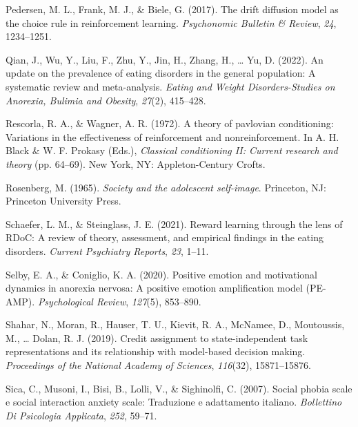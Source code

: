 \documentclass[
  man,floatsintext]{apa6}
\newlength{\cslhangindent}
\newlength{\cslentryspacingunit} %
\newenvironment{CSLReferences}[2] %
 {%
  \setlength{\parindent}{0pt}
  \ifodd #1
  \let\oldpar\par
  \def\par{\hangindent=\cslhangindent\oldpar}
  \fi
  \setlength{\parskip}{#2\cslentryspacingunit}
 }%
 {}
\begin{document}
\begin{CSLReferences}{1}{0}
\leavevmode{}%
Pedersen, M. L., Frank, M. J., \& Biele, G. (2017). The drift diffusion model as the choice rule in reinforcement learning. \emph{Psychonomic Bulletin \& Review}, \emph{24}, 1234--1251.

\leavevmode{}%
Qian, J., Wu, Y., Liu, F., Zhu, Y., Jin, H., Zhang, H., \ldots{} Yu, D. (2022). An update on the prevalence of eating disorders in the general population: A systematic review and meta-analysis. \emph{Eating and Weight Disorders-Studies on Anorexia, Bulimia and Obesity}, \emph{27}(2), 415--428.

\leavevmode{}%
Rescorla, R. A., \& Wagner, A. R. (1972). A theory of pavlovian conditioning: Variations in the effectiveness of reinforcement and nonreinforcement. In A. H. Black \& W. F. Prokasy (Eds.), \emph{Classical conditioning II: Current research and theory} (pp. 64--69). New York, NY: Appleton-Century Crofts.

\leavevmode{}%
Rosenberg, M. (1965). \emph{Society and the adolescent self-image}. Princeton, NJ: Princeton University Press.

\leavevmode{}%
Schaefer, L. M., \& Steinglass, J. E. (2021). Reward learning through the lens of RDoC: A review of theory, assessment, and empirical findings in the eating disorders. \emph{Current Psychiatry Reports}, \emph{23}, 1--11.

\leavevmode{}%
Selby, E. A., \& Coniglio, K. A. (2020). Positive emotion and motivational dynamics in anorexia nervosa: A positive emotion amplification model (PE-AMP). \emph{Psychological Review}, \emph{127}(5), 853--890.

\leavevmode{}%
Shahar, N., Moran, R., Hauser, T. U., Kievit, R. A., McNamee, D., Moutoussis, M., \ldots{} Dolan, R. J. (2019). Credit assignment to state-independent task representations and its relationship with model-based decision making. \emph{Proceedings of the National Academy of Sciences}, \emph{116}(32), 15871--15876.

\leavevmode{}%
Sica, C., Musoni, I., Bisi, B., Lolli, V., \& Sighinolfi, C. (2007). Social phobia scale e social interaction anxiety scale: Traduzione e adattamento italiano. \emph{Bollettino Di Psicologia Applicata}, \emph{252}, 59--71.


\end{CSLReferences}
\end{document}
